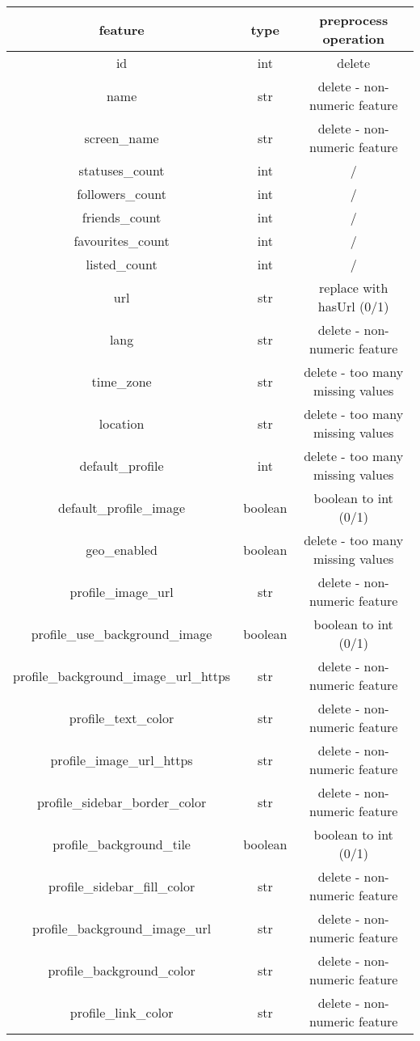 \small
\begin{center}
	\begin{tabular}{ccc}
		\\feature&type&preprocess operation\\
		\hline\hline
		id&int&delete\\
		name&str&delete - non-numeric feature\\
		screen\_name&str&delete - non-numeric feature\\
		statuses\_count&int&/\\
		followers\_count&int&/\\
		friends\_count&int&/\\
		favourites\_count&int&/\\
		listed\_count&int&/\\
		url&str&replace with hasUrl (0/1)\\
		lang&str&delete - non-numeric feature\\
		time\_zone&str&delete - too many missing values\\
		location&str&delete - too many missing values\\
		default\_profile&int&delete - too many missing values\\
		default\_profile\_image&boolean&boolean to int (0/1)\\
		geo\_enabled&boolean&delete - too many missing values\\
		profile\_image\_url&str&delete - non-numeric feature\\
		profile\_use\_background\_image&boolean&boolean to int (0/1)\\
		profile\_background\_image\_url\_https&str&delete - non-numeric feature\\
		profile\_text\_color&str&delete - non-numeric feature\\
		profile\_image\_url\_https&str&delete - non-numeric feature\\
		profile\_sidebar\_border\_color&str&delete - non-numeric feature\\
		profile\_background\_tile&boolean&boolean to int (0/1)\\
		profile\_sidebar\_fill\_color&str&delete - non-numeric feature\\
		profile\_background\_image\_url&str&delete - non-numeric feature\\
		profile\_background\_color&str&delete - non-numeric feature\\
		profile\_link\_color&str&delete - non-numeric feature\\

\end{tabular}
\end{center}
